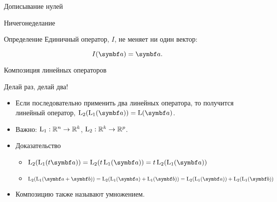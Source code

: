 \begin{frame}{Дописывание нулей}
\begin{minipage}{0.60\linewidth}

\end{minipage}


\end{frame}


\begin{frame}{Ничегонеделание}

	\begin{block}{Определение}
	\alert{Единичный} оператор, $I$, не меняет ни один вектор:

    \[
		I(\ba) = \ba.
	\]
	\end{block}


\end{frame}






\begin{frame}{Композиция линейных операторов}

\alert{Делай раз, делай два!}

\begin{itemize}[<+->]
    \item Если последовательно применить два линейных оператора, 
    то получится линейный оператор, $\LL_2 (\LL_1 (\ba)) = \LL(\ba)$.
\item Важно: $\operatorname{L}_1 : \mathbb{R}^n \to \mathbb{R}^k$, $\operatorname{L}_2 : \mathbb{R}^k \to \mathbb{R}^p$.
    \item \alert{Доказательство}
\begin{itemize}
  \item $\LL_2 (\LL_1 (t \ba)) = \LL_2 (t \LL_1 (\ba)) = t \LL_2(\LL_1(\ba))$
  \item $\LL_2 (\LL_1 (\ba + \bb)) = \LL_2 (\LL_1 (\ba) + \LL_1(\bb)) = \LL_2(\LL_1(\ba)) + \LL_2(\LL_1(\bb))$
\end{itemize}
\item Композицию также называют умножением.

\end{itemize}

\end{frame}


